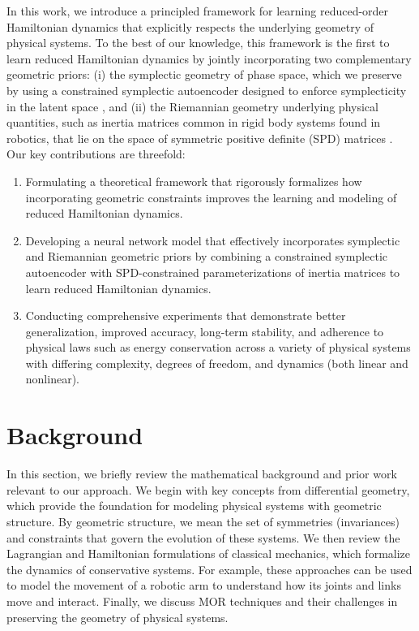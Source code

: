 \documentclass{article}
\theoremstyle{plain}
\theoremstyle{definition}
\theoremstyle{remark}
\begin{document}
In this work, we introduce a principled framework for learning reduced-order Hamiltonian dynamics that explicitly respects the underlying geometry of physical systems. To the best of our knowledge, this framework is the first to learn reduced Hamiltonian dynamics by jointly incorporating two complementary geometric priors: (i) the symplectic geometry of phase space, which we preserve by using a constrained symplectic autoencoder designed to enforce symplecticity in the latent space , and (ii) the Riemannian geometry underlying physical quantities, such as inertia matrices common in rigid body systems found in robotics, that lie on the space of symmetric positive definite (SPD) matrices \cite{goldstein:mechanics}. Our key contributions are threefold: 
\begin{enumerate}
    \item Formulating a theoretical framework that rigorously formalizes how incorporating geometric constraints improves the learning and modeling of reduced Hamiltonian dynamics.
    \item Developing a neural network model that effectively incorporates symplectic and Riemannian geometric priors by combining a constrained symplectic autoencoder with SPD-constrained parameterizations of inertia matrices to learn reduced Hamiltonian dynamics.
    \item Conducting comprehensive experiments that demonstrate better generalization, improved accuracy, long-term stability, and adherence to physical laws such as energy conservation across a variety of physical systems with differing complexity, degrees of freedom, and dynamics (both linear and nonlinear). 
\end{enumerate}

\section{Background}
In this section, we briefly review the mathematical background and prior work relevant to our approach. We begin with key concepts from differential geometry, which provide the foundation for modeling physical systems with geometric structure. By geometric structure, we mean the set of symmetries (invariances) and constraints that govern the evolution of these systems. We then review the Lagrangian and Hamiltonian formulations of classical mechanics, which formalize the dynamics of conservative systems. For example, these approaches can be used to model the movement of a robotic arm to understand how its joints and links move and interact. Finally, we discuss MOR techniques and their challenges in preserving the geometry of physical systems.
\end{document}
